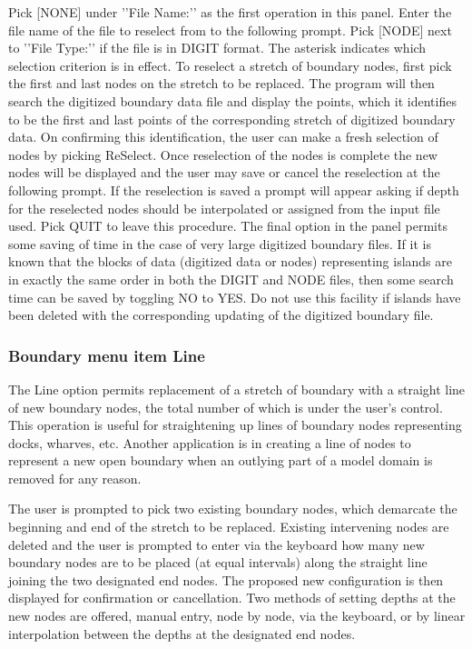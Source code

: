 \documentclass{article}
\begin{document}
Pick [NONE] under '{}'File Name:'{}' as the first operation in this panel. Enter the file name of the file to reselect from to the following prompt. Pick [NODE] next to '{}'File Type:'{}' if the file is in DIGIT format. The asterisk indicates which selection criterion is in effect. To reselect a stretch of boundary nodes, first pick the first and last nodes on the stretch to be replaced. The program will then search the digitized boundary data file and display the points, which it identifies to be the first and last points of the corresponding stretch of digitized boundary data. On confirming this identification, the user can make a fresh selection of nodes by picking ReSelect. Once reselection of the nodes is complete the new nodes will be displayed and the user may save or cancel the reselection at the following prompt. If the reselection is saved a prompt will appear asking if depth for the reselected nodes should be interpolated or assigned from the input file used. Pick QUIT to leave this procedure. The 
final option in the panel permits some saving of time in the case of very large digitized boundary files. If it is known that the blocks of data (digitized data or nodes) representing islands are in exactly the same order in both the DIGIT and NODE files, then some search time can be saved by toggling NO to YES. Do not use this facility if islands have been deleted with the corresponding updating of the digitized boundary file.

\subsubsection[Boundary menu item Line]{Boundary menu item Line}
The Line option permits replacement of a stretch of boundary with a straight line of new boundary nodes, the total number of which is under the user's control. This operation is useful for straightening up lines of boundary nodes representing docks, wharves, etc. Another application is in creating a line of nodes to represent a new open boundary when an outlying part of a model domain is removed for any reason.

The user is prompted to pick two existing boundary nodes, which demarcate the beginning and end of the stretch to be replaced. Existing intervening nodes are deleted and the user is prompted to enter via the keyboard how many new boundary nodes are to be placed (at equal intervals) along the straight line joining the two designated end nodes. The proposed new configuration is then displayed for confirmation or cancellation. Two methods of setting depths at the new nodes are offered, manual entry, node by node, via the keyboard, or by linear interpolation between the depths at the designated end nodes.
\end{document}
